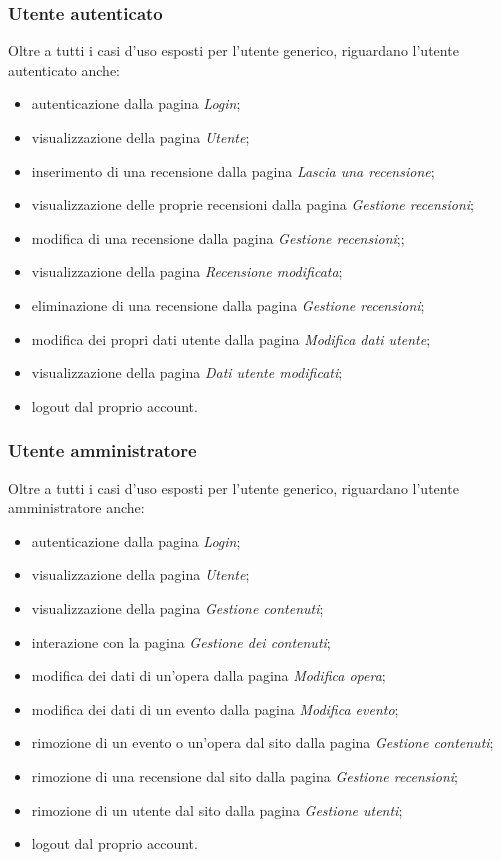 \subsubsection{Utente autenticato}
\label{analisi-casi-uso-attori-principali-utente-autenticato}
Oltre a tutti i casi d'uso esposti per l'utente generico, riguardano l'utente autenticato anche:
\begin{itemize}
	\item autenticazione dalla pagina \textit{Login};
	\item visualizzazione della pagina \textit{Utente};
	\item inserimento di una recensione dalla pagina \textit{Lascia una recensione};
	\item visualizzazione delle proprie recensioni dalla pagina \textit{Gestione recensioni};
	\item modifica di una recensione dalla pagina \textit{Gestione recensioni};;
	\item visualizzazione della pagina \textit{Recensione modificata};
	\item eliminazione di una recensione dalla pagina \textit{Gestione recensioni};
	\item modifica dei propri dati utente dalla pagina \textit{Modifica dati utente};
	\item visualizzazione della pagina \textit{Dati utente modificati};
	\item logout dal proprio account.
\end{itemize}

\subsubsection{Utente amministratore}
\label{analisi-casi-uso-attori-principali-utente-amministratore}
Oltre a tutti i casi d'uso esposti per l'utente generico, riguardano l'utente amministratore anche:
\begin{itemize}
	\item autenticazione dalla pagina \textit{Login};
	\item visualizzazione della pagina \textit{Utente};
	\item visualizzazione della pagina \textit{Gestione contenuti};
	\item interazione con la pagina \textit{Gestione dei contenuti};
	\item modifica dei dati di un'opera dalla pagina \textit{Modifica opera};
	\item modifica dei dati di un evento dalla pagina \textit{Modifica evento};
	\item rimozione di un evento o un'opera dal sito dalla pagina \textit{Gestione contenuti};
	\item rimozione di una recensione dal sito dalla pagina \textit{Gestione recensioni};
	\item rimozione di un utente dal sito dalla pagina \textit{Gestione utenti};
	\item logout dal proprio account.
\end{itemize}
